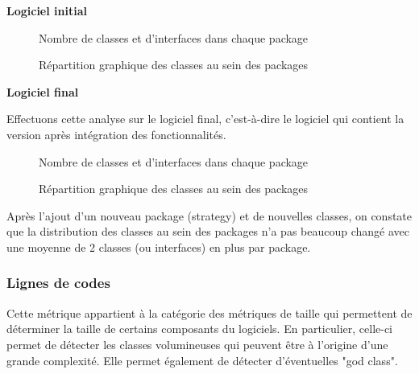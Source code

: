 \documentclass[12pt, openany]{report}
\begin{document}
\textbf{Logiciel initial}

\begin{figure}[!h]
	\centering
	\caption{Nombre de classes et d'interfaces dans chaque package}
	\label{classMetrics1}
\end{figure}

\begin{figure}[!h]
	\centering
	\caption{Répartition graphique des classes au sein des packages}
	\label{classMetrics2}
\end{figure}

\textbf{Logiciel final}

Effectuons cette analyse sur le logiciel final, c'est-à-dire le logiciel qui contient la version après intégration des fonctionnalités.
                     
\begin{figure}[!h]
	\centering
	\caption{Nombre de classes et d'interfaces dans chaque package}
	\label{classMetrics1}
\end{figure}
                     
\begin{figure}[!h]
	\centering
	\caption{Répartition graphique des classes au sein des packages}
	\label{classMetrics2}
\end{figure}

Après l'ajout d'un nouveau package (strategy) et de nouvelles classes, on constate que la distribution des classes au sein des packages n'a pas beaucoup changé avec une moyenne de 2 classes (ou interfaces) en plus par package.

\newpage


                                                                                                                         
\subsubsection*{Lignes de codes}

Cette métrique appartient à la catégorie des métriques de taille qui permettent de déterminer la taille de certains composants du logiciels. En particulier, celle-ci permet de détecter les classes volumineuses qui peuvent être à l'origine d'une grande complexité. Elle permet également de détecter d'éventuelles "god class".
                                                   
\end{document}

